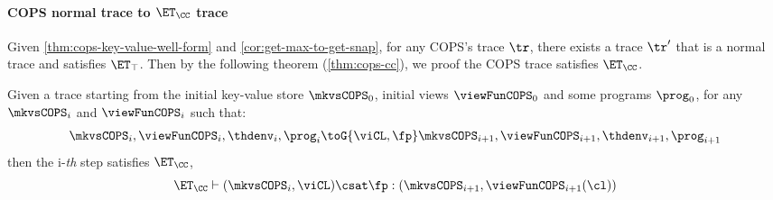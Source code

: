 \paragraph{\bf COPS normal trace to \( \ET_\CC \) trace}
Given \cref{thm:cops-key-value-well-form} and \cref{cor:get-max-to-get-snap}, for any COPS's trace \( \tr \), 
there exists a trace \( \tr' \) that is a normal trace and satisfies \( \ET_\top \).
Then by the following theorem (\cref{thm:cops-cc}), we proof the COPS trace satisfies \( \ET_\CC \).

\begin{theorem}
    \label{thm:cops-cc}
    Given a trace starting from the initial key-value store \( \mkvsCOPS_0 \), initial views \( \viewFunCOPS_0 \) and some programs \( \prog_0 \), for any \( \mkvsCOPS_i \) and \( \viewFunCOPS_i \)  such that: 
    \[
        \mkvsCOPS_i, \viewFunCOPS_i, \thdenv_i, \prog_i \toG{\viCL,\fp} \mkvsCOPS_{i+1}, \viewFunCOPS_{i+1}, \thdenv_{i+1}, \prog_{i+1} 
    \]
    then the i-\emph{th} step satisfies \( \ET_\CC \), \ie
    \[
        \ET_\CC \vdash ( \mkvsCOPS_i, \viCL ) \csat \fp : (\mkvsCOPS_{i+1},\viewFunCOPS_{i+1}(\cl) )
    \]
\end{theorem}
